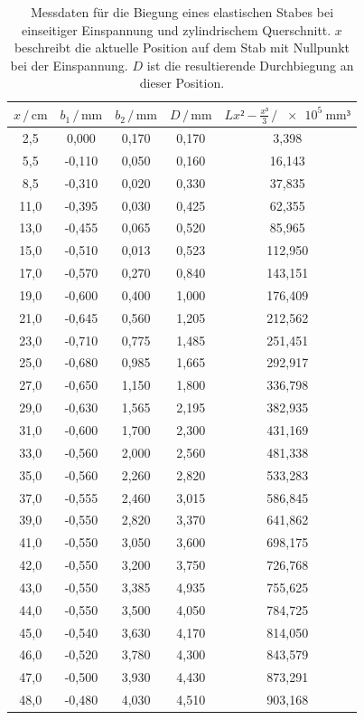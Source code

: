 \begin{table}
\centering
\caption{Messdaten für die Biegung eines elastischen Stabes bei einseitiger Einspannung und 
zylindrischem Querschnitt. $x$ beschreibt die aktuelle Position auf dem Stab mit Nullpunkt bei
der Einspannung. $D$ ist die resultierende Durchbiegung an dieser Position.}
\label{tab:Messdaten2}
\begin{tabular}{c c c c c}
\toprule
$x \,/\, \si{\centi\meter}$ & $b_1 \,/\, \si{\milli\meter}$ & 
$b_2 \,/\, \si{\milli\meter}$ & $D \,/\, \si{\milli\meter}$ &
$Lx²-\frac{x³}{3} \,/\, \SI{e5}{\milli\meter³}$\\
\midrule
 2,5 &  0,000 & 0,170 & 0,170 &   3,398\\
 5,5 & -0,110 & 0,050 & 0,160 &  16,143\\
 8,5 & -0,310 & 0,020 & 0,330 &  37,835\\
11,0 & -0,395 & 0,030 & 0,425 &  62,355\\
13,0 & -0,455 & 0,065 & 0,520 &  85,965\\
15,0 & -0,510 & 0,013 & 0,523 & 112,950\\
17,0 & -0,570 & 0,270 & 0,840 & 143,151\\
19,0 & -0,600 & 0,400 & 1,000 & 176,409\\
21,0 & -0,645 & 0,560 & 1,205 & 212,562\\
23,0 & -0,710 & 0,775 & 1,485 & 251,451\\
25,0 & -0,680 & 0,985 & 1,665 & 292,917\\
27,0 & -0,650 & 1,150 & 1,800 & 336,798\\
29,0 & -0,630 & 1,565 & 2,195 & 382,935\\
31,0 & -0,600 & 1,700 & 2,300 & 431,169\\
33,0 & -0,560 & 2,000 & 2,560 & 481,338\\
35,0 & -0,560 & 2,260 & 2,820 & 533,283\\
37,0 & -0,555 & 2,460 & 3,015 & 586,845\\
39,0 & -0,550 & 2,820 & 3,370 & 641,862\\
41,0 & -0,550 & 3,050 & 3,600 & 698,175\\
42,0 & -0,550 & 3,200 & 3,750 & 726,768\\
43,0 & -0,550 & 3,385 & 4,935 & 755,625\\
44,0 & -0,550 & 3,500 & 4,050 & 784,725\\
45,0 & -0,540 & 3,630 & 4,170 & 814,050\\
46,0 & -0,520 & 3,780 & 4,300 & 843,579\\
47,0 & -0,500 & 3,930 & 4,430 & 873,291\\
48,0 & -0,480 & 4,030 & 4,510 & 903,168\\
\bottomrule
\end{tabular}
\end{table}

